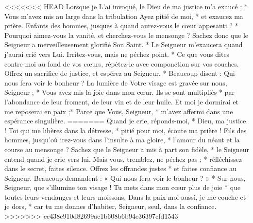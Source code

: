 <<<<<<< HEAD
Lorsque je L'ai invoqué, le Dieu de ma justice m'a exaucé ; * Vous m'avez mis au large dans la tribulation
\versseparator
 Ayez pitié de moi, * et exaucez ma prière.
\versseparator
 Enfants des hommes, jusques à quand aurez-vous le cœur appesanti ? * Pourquoi aimez-vous la vanité, et cherchez-vous le mensonge ?
\versseparator
 Sachez donc que le Seigneur a merveilleusement glorifié Son Saint. * Le Seigneur m'exaucera quand j'aurai crié vers Lui.
\versseparator
 Irritez-vous, mais ne péchez point. * Ce que vous dites contre moi au fond de vos cœurs, répétez-le avec componction sur vos couches.
\versseparator
 Offrez un sacrifice de justice, et espérez au Seigneur. * Beaucoup disent : Qui nous fera voir le bonheur ?
\versseparator
 La lumière de Votre visage est gravée sur nous, Seigneur ; * Vous avez mis la joie dans mon cœur.
\versseparator
 Ils se sont multipliés * par l'abondance de leur froment, de leur vin et de leur huile.
\versseparator
 Et moi je dormirai et me reposerai en paix ;*
\versseparator
 Parce que Vous, Seigneur, * m'avez affermi dans une espérance singulière.
=======
Quand je crie, réponds-moi, *
Dieu, ma justice !
\versseparator
Toi qui me libères dans la détresse, *
pitié pour moi, écoute ma prière !
\versseparator
Fils des hommes,
jusqu'où irez-vous dans l'insulte à ma gloire, *
l'amour du néant et la course au mensonge ?
\versseparator
Sachez que le Seigneur a mis à part son fidèle, *
le Seigneur entend quand je crie vers lui.
\versseparator
Mais vous, tremblez, ne péchez pas ; *
réfléchissez dans le secret, faites silence.
\versseparator
Offrez les offrandes justes *
et faites confiance au Seigneur.
\versseparator
Beaucoup demandent :
« Qui nous fera voir le bonheur ? » *
Sur nous, Seigneur, que s'illumine ton visage !
\versseparator
Tu mets dans mon cœur plus de joie *
que toutes leurs vendanges et leurs moissons.
\versseparator
Dans la paix moi aussi, je me couche et je dors, *
car tu me donnes d'habiter, Seigneur,
seul, dans la confiance.
>>>>>>> ec438c910d82699ac1b608b6b94e36397cfd1543
